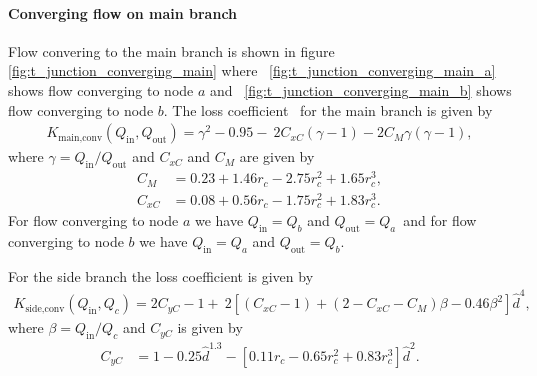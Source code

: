 \paragraph{Converging flow on main branch}

Flow convering to the main branch is shown in figure \ref{fig:t_junction_converging_main} where \ 
\ref{fig:t_junction_converging_main_a} shows flow converging to node $a$ and \ 
\ref{fig:t_junction_converging_main_b} shows flow converging to node $b$. The loss coefficient \ 
for the main branch is given by
\begin{align} \label{eq:K_main_conv}
    K_{\text{main,conv}}(Q_{\text{in}}, Q_{\text{out}}) = \gamma^2 - 0.95 - \ 
    2C_{xC} \left(\gamma - 1 \right) - 2C_M \gamma ( \gamma - 1 ), 
\end{align}
where $\gamma = Q_{\text{in}} / Q_{\text{out}}$ and $C_{xC}$ and $C_M$ are given by
\begin{align}
    C_{M} &= 0.23 + 1.46 r_c -2.75 r_c^2 + 1.65 r_c^3 , \\
    C_{xC} &= 0.08 + 0.56 r_c -1.75 r_c^2 + 1.83 r_c^3.
\end{align}
For flow converging to node $a$ we have $Q_{\text{in}} = Q_b$ and $Q_{\text{out}}=Q_a$\
and for flow converging to node $b$ we have $Q_{\text{in}} = Q_a$ and $Q_{\text{out}}=Q_b$. 

For the side branch the loss coefficient is given by
\begin{align} \label{eq:K_side_conv}
    K_{\text{side,conv}}(Q_{\text{in}}, Q_c) = 2 C_{yC} - 1 + \
    2\left[\left(C_{xC}-1\right) + \left(2-C_{xC}-C_M \right) \beta - 0.46\beta^2 \right]\hat{d}^4,
\end{align}
where $\beta = Q_{\text{in}} / Q_c$ and $C_{yC}$ is given by
\begin{align}
    C_{yC} &= 1 - 0.25\hat{d}^{1.3} - \left[ 0.11 r_c -0.65 r_c^2 + 0.83 r_c^3 \right] \hat{d}^2.
\end{align}


